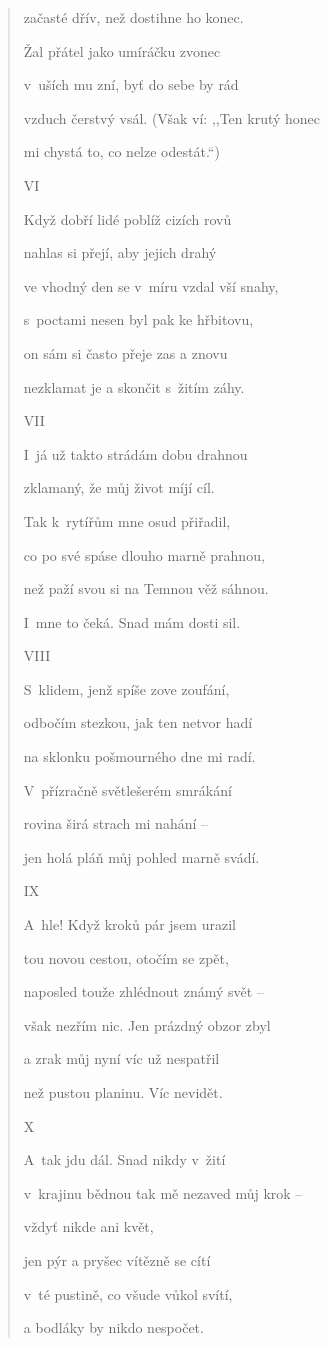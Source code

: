 \begin{verse}
začasté dřív, než dostihne ho konec.

Žal přátel jako umíráčku zvonec

v~uších mu zní, byť do sebe by rád

vzduch čerstvý vsál. (Však ví: ,,Ten krutý honec

mi chystá to, co nelze odestát.``)

\medskip

VI

Když dobří lidé poblíž cizích rovů

nahlas si přejí, aby jejich drahý

ve vhodný den se v~míru vzdal vší snahy,

s~poctami nesen byl pak ke hřbitovu,

on sám si často přeje zas a znovu

nezklamat je a skončit s~žitím záhy.

\medskip

VII

I~já už takto strádám dobu drahnou

zklamaný, že můj život míjí cíl.

Tak k~rytířům mne osud přiřadil,

co po své spáse dlouho marně prahnou,

než paží svou si na Temnou věž sáhnou.

I~mne to čeká. Snad mám dosti sil.

\medskip

VIII

S~klidem, jenž spíše zove zoufání,

odbočím stezkou, jak ten netvor hadí

na sklonku pošmourného dne mi radí.

V~přízračně světlešerém smrákání

rovina širá strach mi nahání --

jen holá pláň můj pohled marně svádí.

\medskip

IX

A~hle! Když kroků pár jsem urazil

tou novou cestou, otočím se zpět,

naposled touže zhlédnout známý svět --

však nezřím nic. Jen prázdný obzor zbyl

a zrak můj nyní víc už nespatřil

než pustou planinu. Víc nevidět.

\medskip

X

A~tak jdu dál. Snad nikdy v~žití

v~krajinu bědnou tak mě nezaved můj krok --

vždyť nikde ani květ,

jen pýr a pryšec vítězně se cítí

v~té pustině, co všude vůkol svítí,

a bodláky by nikdo nespočet.

\end{verse}

